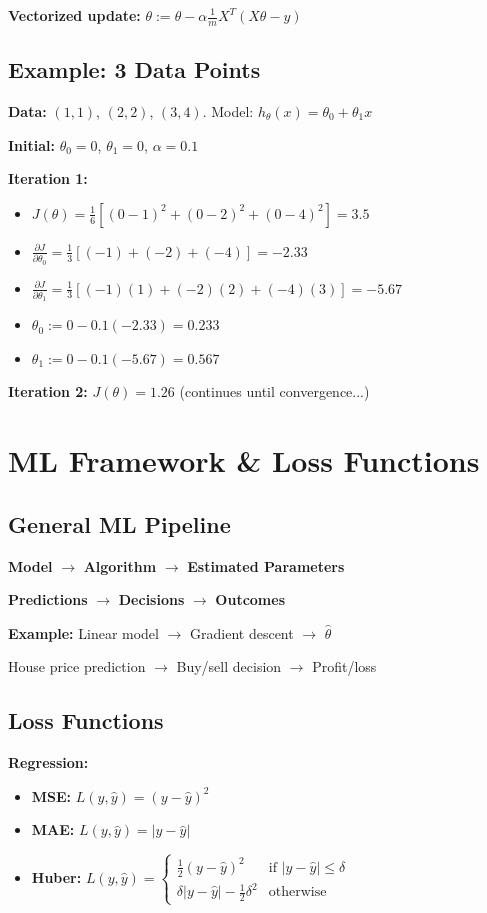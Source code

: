 \documentclass{article}
\begin{document}
\textbf{Vectorized update:} $\theta := \theta - \alpha \frac{1}{m} X^T(X\theta - y)$

\subsection{Example: 3 Data Points}
\textbf{Data:} $(1,1)$, $(2,2)$, $(3,4)$. Model: $h_\theta(x) = \theta_0 + \theta_1 x$

\textbf{Initial:} $\theta_0 = 0$, $\theta_1 = 0$, $\alpha = 0.1$

\textbf{Iteration 1:}
\begin{itemize}
    \item $J(\theta) = \frac{1}{6}[(0-1)^2 + (0-2)^2 + (0-4)^2] = 3.5$
    \item $\frac{\partial J}{\partial \theta_0} = \frac{1}{3}[(-1) + (-2) + (-4)] = -2.33$
    \item $\frac{\partial J}{\partial \theta_1} = \frac{1}{3}[(-1)(1) + (-2)(2) + (-4)(3)] = -5.67$
    \item $\theta_0 := 0 - 0.1(-2.33) = 0.233$
    \item $\theta_1 := 0 - 0.1(-5.67) = 0.567$
\end{itemize}

\textbf{Iteration 2:} $J(\theta) = 1.26$ (continues until convergence...)

\section{ML Framework \& Loss Functions}

\subsection{General ML Pipeline}
\textbf{Model} $\rightarrow$ \textbf{Algorithm} $\rightarrow$ \textbf{Estimated Parameters}

\textbf{Predictions} $\rightarrow$ \textbf{Decisions} $\rightarrow$ \textbf{Outcomes}

\textbf{Example:} Linear model $\rightarrow$ Gradient descent $\rightarrow$ $\hat{\theta}$

House price prediction $\rightarrow$ Buy/sell decision $\rightarrow$ Profit/loss

\subsection{Loss Functions}
\textbf{Regression:}
\begin{itemize}
    \item \textbf{MSE:} $L(y, \hat{y}) = (y - \hat{y})^2$
    \item \textbf{MAE:} $L(y, \hat{y}) = |y - \hat{y}|$
    \item \textbf{Huber:} $L(y, \hat{y}) = \begin{cases} \frac{1}{2}(y-\hat{y})^2 & \text{if } |y-\hat{y}| \leq \delta \\ \delta|y-\hat{y}| - \frac{1}{2}\delta^2 & \text{otherwise} \end{cases}$
\end{itemize}
\end{document}
